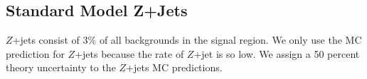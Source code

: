 
\subsection{Standard Model Z+Jets}
\label{sec:Bkg:zjet}

\indent $Z$+jets consist of 3\% of all backgrounds in the signal region.   We only use the MC prediction for $Z$+jets because the rate of $Z$+jet is so low.  We assign a 50 percent theory uncertainty to the $Z$+jets MC predictions.  \\


